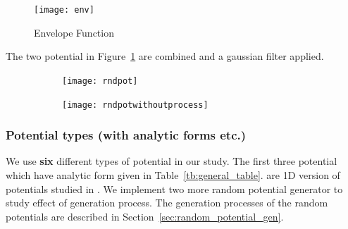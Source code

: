 \documentclass[a4paper,times,12pt]{article}
\begin{document}
\graphicspath{{"../figs/potentials/"}}
\begin{figure}[H]
\centering
\texttt{[image: env]}
\caption{Envelope Function}
\label{fig:envelope_and_random_withot_pros}
\end{figure}

The two potential in Figure~\ref{fig:envelope_and_random_withot_pros} are combined and a gaussian filter applied. 

\graphicspath{{"../figs/numericanalyze/"}}
\begin{figure}[H]
\begin{subfigure}[t]{0.45\textwidth}
    \texttt{[image: rndpot]}
\end{subfigure}
\begin{subfigure}[t]{0.45\textwidth}
    \texttt{[image: rndpotwithoutprocess]}
\end{subfigure}
\end{figure}




\subsubsection{Potential types (with analytic forms etc.)}

We use \textbf{six} different types of potential in our study. The first three potential which have analytic form given in Table~\ref{tb:general_table}. are 1D version of potentials studied in \cite{mills2017deep}. We implement two more random potential generator to study effect of generation process. The generation processes of the random potentials are described in Section~\ref{sec:random_potential_gen}.

\newcommand{\infinitewell}{$
V(x) = 
    \begin{cases}
       0 &\quad\text{if } x_l < x < x_r  \\
       \infty &\quad\text{if } \textit{otherwise} \\
    \end{cases}
$}

\newcommand{\harmonicpot}{$ V(x) =  \frac{1}{2}m \omega^2 (x - x_0) ^2 $}

\newcommand{\gaussianpot}{$ V(x) = -A_1 \exp(\frac{(x - \mu_1)^2}{\sigma_1^2}) -A_2 \exp(\frac{(x - \mu_2)^2}{\sigma_2^2})  $
}

\newcommand{\randomexplation}{Summation of sines and cosines with random coefficients}
\end{document}

